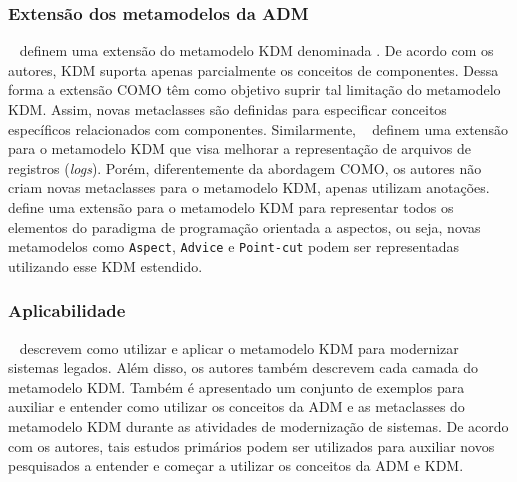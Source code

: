 \subsubsection{Extensão dos metamodelos da ADM} %
\label{ssub:extension_of_adm_s_metamodels}

~ definem uma extensão do metamodelo KDM denominada . De acordo com os autores, KDM suporta apenas parcialmente os conceitos de componentes. Dessa forma a extensão COMO têm como objetivo suprir tal limitação do metamodelo KDM. Assim, novas metaclasses são definidas para especificar conceitos específicos relacionados com componentes. Similarmente, ~ definem uma extensão para o metamodelo KDM que visa melhorar a representação de arquivos de registros (\textit{logs}). Porém, diferentemente da abordagem COMO, os autores não criam novas metaclasses para o metamodelo KDM, apenas utilizam anotações. ~ define uma extensão para o metamodelo KDM para representar todos os elementos do paradigma de programação orientada a aspectos, ou seja, novas metamodelos como \texttt{Aspect}, \texttt{Advice} e \texttt{Point-cut} podem ser representadas utilizando esse KDM estendido.


\subsubsection{Aplicabilidade} %
\label{ssub:applicability}


~ descrevem como utilizar e aplicar  o metamodelo KDM para modernizar sistemas legados. Além disso, os autores também descrevem cada camada do metamodelo KDM. Também é apresentado um conjunto de exemplos para auxiliar e entender como utilizar os conceitos da ADM e as metaclasses do metamodelo KDM durante as atividades de modernização de sistemas. De acordo com os autores, tais estudos primários podem ser utilizados para auxiliar novos pesquisados a entender e começar a utilizar os conceitos da ADM e KDM.


